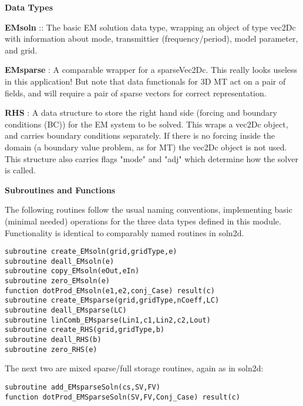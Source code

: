 \documentclass[12pt]{article}
\begin{document}
\vspace{10pt}

\noindent
{\bf Data Types}

\vspace{6pt}

\noindent
{\bf EMsoln} :: The basic EM solution data type, wrapping an object of type vec2Dc with
information about mode, transmittier (frequency/period), 
model parameter, and grid.

\noindent
{\bf EMsparse} : A comparable wrapper for a sparseVec2Dc.  This really looks useless
in this application!  But note that data functionals for 3D
MT act on a pair of fields, and will require a pair of sparse vectors
for correct representation.

\noindent
{\bf RHS} : A data structure to store the right hand side (forcing and boundary
conditions (BC)) for the EM system to be solved.  This wraps a
vec2Dc object, and carries boundary conditions separately.
If there is no forcing inside the domain (a boundary value
problem, as for MT) the vec2Dc object is not used.
This structure also carries flags "mode" and "adj" which determine
how the solver is called.

\vspace{10pt}

\noindent
{\bf Subroutines and Functions}

\vspace{6pt}

The following routines follow the usual naming conventions,
implementing basic (minimal needed) operations for the three
data types defined in this module.  Functionality is identical
to comparably named routines in soln2d.

\begin{verbatim}
subroutine create_EMsoln(grid,gridType,e)
subroutine deall_EMsoln(e)
subroutine copy_EMsoln(eOut,eIn)
subroutine zero_EMsoln(e)
function dotProd_EMsoln(e1,e2,conj_Case) result(c)
subroutine create_EMsparse(grid,gridType,nCoeff,LC)
subroutine deall_EMsparse(LC)
subroutine linComb_EMsparse(Lin1,c1,Lin2,c2,Lout)
subroutine create_RHS(grid,gridType,b)
subroutine deall_RHS(b)
subroutine zero_RHS(e)
\end{verbatim}

The next two are mixed sparse/full storage routines, again as
in soln2d:

\begin{verbatim}
subroutine add_EMsparseSoln(cs,SV,FV)
function dotProd_EMSparseSoln(SV,FV,Conj_Case) result(c)
\end{verbatim}
\end{document}
